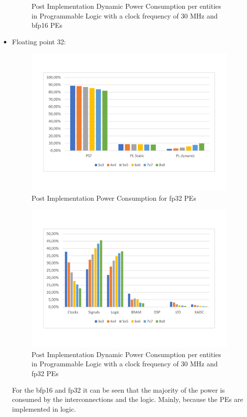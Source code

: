 \begin{itemize}
\begin{figure}[!htbp]
\caption{Post Implementation Dynamic Power Consumption per entities in Programmable Logic with a clock frequency of 30 MHz and bfp16 PEs}
\label{fig:dynpowintbfp16ent30}
\end{figure}
\newpage
\item Floating point 32: 
\begin{figure}[!htbp]
\centering
\captionsetup{justification=centering}
\includegraphics[scale=0.47,angle=0]{./figure/graphs/power_fp32_freq.pdf}
\caption{Post Implementation Power Consumption for fp32 PEs}
\label{fig:powfp32}
\end{figure}
\begin{figure}[!htbp]
\centering
\captionsetup{justification=centering}
\includegraphics[scale=0.47,angle=0]{./figure/graphs/power_pldyn_div_fp32_freq_30mhz.pdf}
\caption{Post Implementation Dynamic Power Consumption per entities in Programmable Logic with a clock frequency of 30 MHz and fp32 PEs}
\label{fig:dynpowintfp32ent30}
\end{figure}
For the bfp16 and fp32 it can be seen that the majority of the power is consumed by the interconnections and the logic. Mainly, because the PEs are implemented in logic.
\end{itemize}

